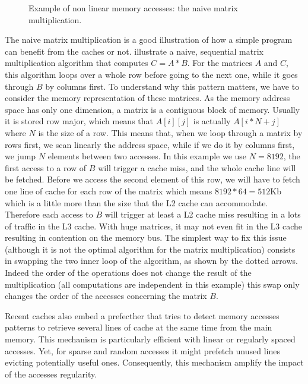 \begin{figure}[htb]
    \centering
    
    \caption[Example of non linear memory accesses.]{Example of non linear memory accesses: the naive matrix multiplication.}
    \label{fig:mat-mult}
\end{figure}

The naive matrix multiplication is a good illustration of how a simple program can benefit from the caches or not.
 illustrate a naive, sequential matrix multiplication algorithm that computes $C=A*B$.
For the matrices $A$ and $C$, this algorithm loops over a whole row before going to the next one, while it goes through $B$ by columns first.
To understand why this pattern matters, we have to consider the memory representation of these matrices.
As the memory address space has only one dimension, a matrix is a contiguous block of memory.
Usually it is stored row major, which means that $A[i][j]$ is actually $A[i*N+j]$ where $N$ is the size of a row.
This means that, when we loop through a matrix by rows first, we scan linearly the address space, while if we do it by columns first, we jump $N$ elements between two accesses.
In this example we use $N=8192$, the first access to a row of $B$ will trigger a cache miss, and the whole cache line will be fetched.
Before we access the second element of this row, we will have to fetch one line of cache for each row of the matrix which means $8192*64=512$Kb which is a little more than the size that the L2 cache can accommodate.
Therefore each access to $B$ will trigger at least a L2 cache miss resulting in a lots of traffic in the L3 cache.
With huge matrices, it may not even fit in the L3 cache resulting in contention on the memory bus.
The simplest way to fix this issue (although it is not the optimal algorithm for the matrix multiplication) consists in swapping the two inner loop of the algorithm, as shown by the dotted arrows.
Indeed the order of the operations does not change the result of the multiplication (all computations are independent in this example) this swap only changes the order of the accesses concerning the matrix $B$.

Recent caches also embed a prefecther that tries to detect memory accesses patterns to retrieve several lines of cache at the same time from the main memory.
This mechanism is particularly efficient with linear or regularly spaced accesses.
Yet, for sparse and random accesses it might prefetch unused lines evicting potentially useful ones.
Consequently, this mechanism amplify the impact of the accesses regularity.

